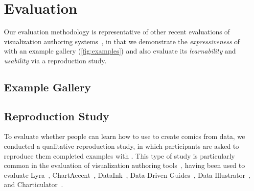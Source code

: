 
\section{Evaluation}

Our evaluation methodology is representative of other recent evaluations of visualization authoring systems~\cite{ren2018beliv}, in that we demonstrate the {\it expressiveness} of \toolname{} with an example gallery (\autoref{fig:examples}) and
also evaluate its {\it learnability} and {\it usability} via a reproduction study.

\subsection{Example Gallery}

 
\subsection{Reproduction Study}
To evaluate whether people can learn how to use \toolname{} to create comics from data, we conducted a qualitative reproduction study, in which participants are asked to reproduce them completed examples with \toolname{}. 
This type of study is particularly common in the evaluation of visualization authoring tools~\cite{ren2018beliv}, having been used to evaluate Lyra~\cite{satyanarayan2014lyra}, ChartAccent~\cite{ren2017chartaccent}, DataInk~\cite{xia2018dataink}, Data-Driven Guides~\cite{kim2017data}, Data Illustrator~\cite{liu2018data}, and Charticulator~\cite{ren2018chart}. 


